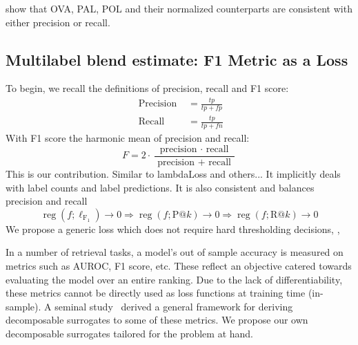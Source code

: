 \citet{multilabelReduction} show that OVA, PAL, POL and their normalized counterparts are consistent with either precision or recall. 


\subsection{Multilabel blend estimate: F1 Metric as a Loss}
\label{section:background:metricsAsLosses}

To begin, we recall the definitions of precision, recall and F1 score:
%
\begin{equation}
	\begin{aligned} 
		\text { Precision } &=\frac{t p}{t p+f p} \\ 
		\text{ Recall } &=\frac{t p}{t p+f n} 
	\end{aligned}
\end{equation}
%
With F1 score the harmonic mean of precision and recall:
%
\begin{equation}
F=2 \cdot \frac{\text { precision } \cdot \text { recall }}{\text { precision }+\text { recall }}
\end{equation}
%
This is our contribution. Similar to lambdaLoss and others... It implicitly deals with label counts and label predictions. It is also consistent and balances precision and recall 
%
\begin{equation}
\operatorname{reg}\left(f ; \ell_{\mathrm{F_1}}\right) \rightarrow 0 \Longrightarrow \operatorname{reg}\left(f ; \mathrm{P} @ k\right) \rightarrow 0 \Longrightarrow \operatorname{reg}\left(f ; \mathrm{R} @ k\right) \rightarrow 0
\end{equation}
%
We propose a generic loss which does not require hard thresholding decisions, , 

In a number of retrieval tasks, a model's out of sample accuracy is measured
on metrics such as AUROC, F1 score, etc. These reflect an objective catered
towards evaluating the model over an entire ranking. Due to the lack of
differentiability, these metrics cannot be directly used as loss functions at
training time (in-sample). A seminal study~\cite{optimizableLosses} derived a
general framework for deriving decomposable surrogates to some of these
metrics. We propose our own decomposable surrogates tailored for the problem
at hand.

